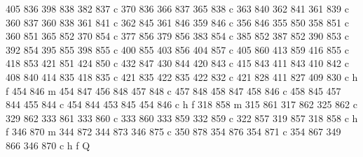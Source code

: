 {{        405 836 398 838 382 837 c
        370 836 366 837 365 838 c
        363 840 362 841 361 839 c
        360 837 360 838 361 841 c
        362 845 361 846 359 846 c
        356 846 355 850 358 851 c
        360 851 365 852 370 854 c
        377 856 379 856 383 854 c
        385 852 387 852 390 853 c
        392 854 395 855 398 855 c
        400 855 403 856 404 857 c
        405 860 413 859 416 855 c
        418 853 421 851 424 850 c
        432 847 430 844 420 843 c
        415 843 411 843 410 842 c
        408 840 414 835 418 835 c
        421 835 422 835 422 832 c
        421 828 411 827 409 830 c
        h f
        454 846 m
        454 847 456 848 457 848 c
        457 848 458 847 458 846 c
        458 845 457 844 455 844 c
        454 844 453 845 454 846 c
        h f
        318 858 m
        315 861 317 862 325 862 c
        329 862 333 861 333 860 c
        333 860 333 859 332 859 c
        322 857 319 857 318 858 c
        h f
        346 870 m
        344 872 344 873 346 875 c
        350 878 354 876 354 871 c
        354 867 349 866 346 870 c
        h f
        Q
    }}